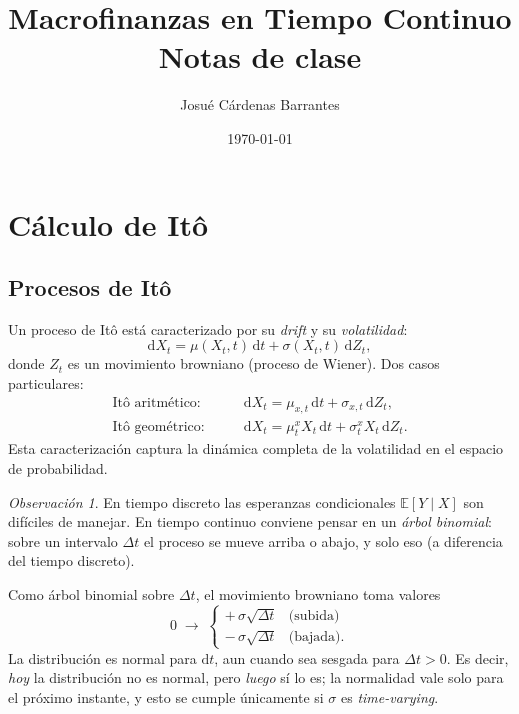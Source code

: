 \documentclass[11pt]{article}
\title{Macrofinanzas en Tiempo Continuo\\[0.2em]
\large Notas de clase}
\author{Josué Cárdenas Barrantes}
\date{\today}
\theoremstyle{definition}
\theoremstyle{remark}
\newtheorem*{obs}{Observación}
\newcommand{\dd}{\mathrm{d}}
\newcommand{\E}{\mathbb{E}}
\begin{document}
\maketitle

\tableofcontents
\bigskip

\section{Cálculo de Itô}

\subsection{Procesos de Itô}

Un proceso de Itô está caracterizado por su \emph{drift} y su \emph{volatilidad}:
\begin{equation}
\dd X_t = \mu(X_t,t)\,\dd t + \sigma(X_t,t)\,\dd Z_t,
\end{equation}
donde $Z_t$ es un movimiento browniano (proceso de Wiener). Dos casos particulares:
\begin{align}
\text{Itô aritmético:}\qquad & \dd X_t = \mu_{x,t}\,\dd t + \sigma_{x,t}\,\dd Z_t,\\
\text{Itô geométrico:}\qquad & \dd X_t = \mu_t^{x} X_t\,\dd t + \sigma_t^{x} X_t\,\dd Z_t.
\end{align}
Esta caracterización captura la dinámica completa de la volatilidad en el espacio de probabilidad.

\begin{obs}
En tiempo discreto las esperanzas condicionales $\E[Y\mid X]$ son difíciles de manejar. En tiempo continuo conviene pensar en un \emph{árbol binomial}: sobre un intervalo $\Delta t$ el proceso se mueve arriba o abajo, y solo eso (a diferencia del tiempo discreto).
\end{obs}

Como árbol binomial sobre $\Delta t$, el movimiento browniano toma valores
\[
0 \;\longrightarrow\;
\begin{cases}
+\,\sigma\sqrt{\Delta t} & \text{(subida)}\\[2pt]
-\,\sigma\sqrt{\Delta t} & \text{(bajada)}.
\end{cases}
\]
La distribución es normal para $\dd t$, aun cuando sea sesgada para $\Delta t>0$. Es decir, \emph{hoy} la distribución no es normal, pero \emph{luego} sí lo es; la normalidad vale solo para el próximo instante, y esto se cumple únicamente si $\sigma$ es \emph{time-varying}.
\end{document}
